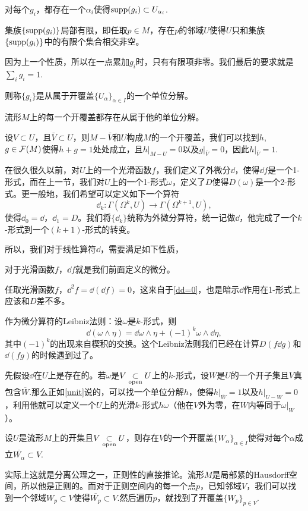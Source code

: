  对每个$g_i$，都存在一个${\alpha_i}$使得$\operatorname{supp}(g_i)\subset U_{\alpha_i}$.

 集族$\{\operatorname{supp}(g_i)\}$局部有限，即任取$p\in M$，存在$p$的邻域$U$使得$U$只和集族$\{\operatorname{supp}(g_i)\}$中的有限个集合相交非空。

 因为上一个性质，所以在一点累加$g_i$时，只有有限项非零。我们最后的要求就是$\sum_i g_i=1$.

则称$\{g_i\}$是从属于开覆盖$\{U_\alpha\}_{\alpha\in I}$的一个单位分解。

\textbf{} 流形$M$上的每一个开覆盖都存在从属于他的单位分解。

\para \label{unit} 设$V\subset U$，且$\bar{V}\subset U$，则$M-\bar{V}$和$U$构成$M$的一个开覆盖，我们可以找到$h$, $g\in \mathcal{F}(M)$使得$h+g=1$处处成立，且$h|_{M-U}=0$以及$g|_{\bar{V}}=0$，因此$h|_{\bar{V}}=1$.

\para 在很久很久以前，对$U$上的一个光滑函数$f$，我们定义了外微分$\dd$，使得$\dd f$是一个1-形式，而在上一节，我们对$U$上的一个1-形式$\omega$，定义了$D$使得$D(\omega)$是一个2-形式。更一般地，我们希望可以定义如下一个算符
\[
	\dd_k:\Gamma(\Omega^k,U)\to \Gamma(\Omega^{k+1},U),
\]
使得$\dd_0=\dd$，$\dd_1=D$。我们将$\{\dd_k\}$统称为外微分算符，统一记做$\dd$，他完成了一个$k$-形式到一个$(k+1)$-形式的转变。

所以，我们对于线性算符$\dd$，需要满足如下性质，

 对于光滑函数$f$，$\dd f$就是我们前面定义的微分。

 任取光滑函数$f$，$\dd^2 f=\dd (\dd f)=0$，这来自于\eqref{dd=0}，也是暗示$\dd$作用在1-形式上应该和$D$差不多。

 作为微分算符的Leibniz法则：设$\omega$是$k$-形式，则
\[
	\dd(\omega\wedge \eta)=\dd \omega \wedge \eta +(-1)^k \omega\wedge \dd\eta,
\]
其中$(-1)^k$的出现来自楔积的交换。这个Leibniz法则我们已经在计算$D(f\dd g)$和$\dd(fg)$的时候遇到过了。

\para \label{localform}先假设$\dd$在$U$上是存在的。若$\omega$是$V\underset{\mathrm{open}}{\subset} U$上的$k$-形式，设$W$是$U$的一个开子集且$V$真包含$\overline{W}$.那么正如\eqref{unit}说的，可以找一个单位分解$h$，使得$h|_{\overline{W}}=1$以及$h|_{U-W}=0$，利用他就可以定义一个$U$上的光滑$k$-形式$h\omega$（他在$V$外为零，在$W$内等同于$\omega|_W$）。

\para \label{regular}设$U$是流形$M$上的开集且$V\underset{\mathrm{open}}{\subset} U$，则存在$V$的一个开覆盖$\{W_\alpha\}_{\alpha\in I}$使得对每个$\alpha$成立$\overline{W_\alpha}\subset V$.

实际上这就是分离公理之一，正则性的直接推论。流形$M$是局部紧的Hausdorff空间，所以他是正则的。而对于正则空间内的每一个点$p$，已知邻域$V$，我们可以找到一个邻域$W_p\subset V$使得$\overline{W_p}\subset V$.然后遍历$p$，就找到了开覆盖$\{W_p\}_{p\in V}$.


